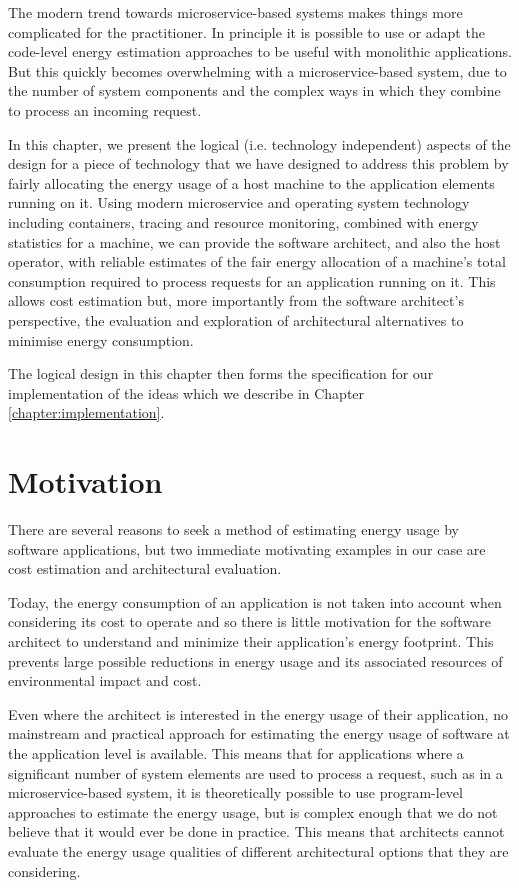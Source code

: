 The modern trend towards microservice-based systems \cite{wikipedia_microservices} makes things more complicated for the practitioner.  In principle it is possible to use or adapt the code-level energy estimation approaches to be useful with monolithic applications.  But this quickly becomes overwhelming with a microservice-based system, due to the number of system components and the complex ways in which they combine to process an incoming request.

In this chapter, we present the logical (i.e. technology independent) aspects of the design for a piece of technology that we have designed to address this problem by fairly allocating the energy usage of a host machine to the application elements running on it.  Using modern microservice and operating system technology including containers, tracing and resource monitoring, combined with energy statistics for a machine, we can provide the software architect, and also the host operator, with reliable estimates of the fair energy allocation of a machine's total consumption required to process requests for an application running on it.  This allows cost estimation but, more importantly from the software architect's perspective, the evaluation and exploration of architectural alternatives to minimise energy consumption.

The logical design in this chapter then forms the specification for our implementation of the ideas which we describe in Chapter \ref{chapter:implementation}.

\section{Motivation}

There are several reasons to seek a method of estimating energy usage by software applications, but two immediate motivating examples in our case are cost estimation and architectural evaluation.

Today, the energy consumption of an application is not taken into account when considering its cost to operate and so there is little motivation for the software architect to understand and minimize their application's energy footprint.  This prevents large possible reductions in energy usage and its associated resources of environmental impact and cost.

Even where the architect is interested in the energy usage of their application, no mainstream and practical approach for estimating the energy usage of software at the application level is available.  This means that for applications where a significant number of system elements are used to process a request, such as in a microservice-based system, it is theoretically possible to use program-level approaches to estimate the energy usage, but is complex enough that we do not believe that it would ever be done in practice.  This means that architects cannot evaluate the energy usage qualities of different architectural options that they are considering.

